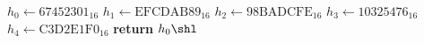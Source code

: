 \begin{algorithmic}[1]
\State $h_0\gets \textrm{67452301}_{16}$
\State $h_1\gets \textrm{EFCDAB89}_{16}$
\State $h_2\gets \textrm{98BADCFE}_{16}$
\State $h_3\gets \textrm{10325476}_{16}$
\State $h_4\gets \textrm{C3D2E1F0}_{16}$
\EndFor
\State \textbf{return} $h_0\shl$
\EndProcedure
\end{algorithmic}